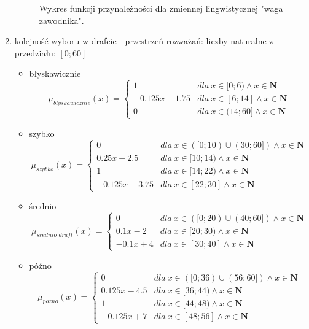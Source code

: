\documentclass{classrep}
\begin{document}
\begin{enumerate}
\begin{figure}[H]
        \caption{Wykres funkcji przynależności dla zmiennej lingwistycznej "waga zawodnika".}
        \label{rysunek:waga}
    \end{figure}
    
    \item kolejność wyboru w drafcie - przestrzeń rozważań: liczby naturalne z przedziału: $[0;60]$
    \begin{itemize}
        \item błyskawicznie
        \begin{equation}
            \mu_{blyskawicznie}(x) = \left\{\begin{matrix} 1 & dla \: x\in[0;6) \wedge x\in \mathbf{N} \\ -0.125x + 1.75 & dla \: x\in [6; 14] \wedge x\in \mathbf{N} \\ 0 & dla \: x\in (14;60] \wedge x\in \mathbf{N} \end{matrix}\right.
        \end{equation}
         \item szybko
        \begin{equation}
            \mu_{szybko}(x) = \left\{\begin{matrix} 0 & dla \: x\in ([0;10) \cup (30;60]) \wedge x\in \mathbf{N} \\ 0.25x - 2.5 & dla \: x\in[10;14) \wedge x\in \mathbf{N} \\ 1 & dla \: x\in [14;22) \wedge x\in \mathbf{N} \\ -0.125x + 3.75 & dla \: x\in [22; 30] \wedge x\in \mathbf{N} \end{matrix}\right.
        \end{equation}
        \item średnio
        \begin{equation}
            \mu_{srednio\_draft}(x) = \left\{\begin{matrix} 0 & dla \: x\in ([0;20) \cup (40;60]) \wedge x\in \mathbf{N} \\ 0.1x - 2 & dla \: x\in[20;30) \wedge x\in \mathbf{N} \\ -0.1x + 4 & dla \: x\in [30; 40] \wedge x\in \mathbf{N} \end{matrix}\right.
        \end{equation}
        \item późno
        \begin{equation}
            \mu_{pozno}(x) = \left\{\begin{matrix} 0 & dla \: x\in ([0;36) \cup (56;60]) \wedge x\in \mathbf{N} \\ 0.125x - 4.5 & dla \: x\in[36;44) \wedge x\in \mathbf{N} \\ 1 & dla \: x\in [44;48) \wedge x\in \mathbf{N} \\ -0.125x + 7 & dla \: x\in [48; 56] \wedge x\in \mathbf{N} \end{matrix}\right.

\end{equation}
\end{itemize}
\end{enumerate}
\end{document}
